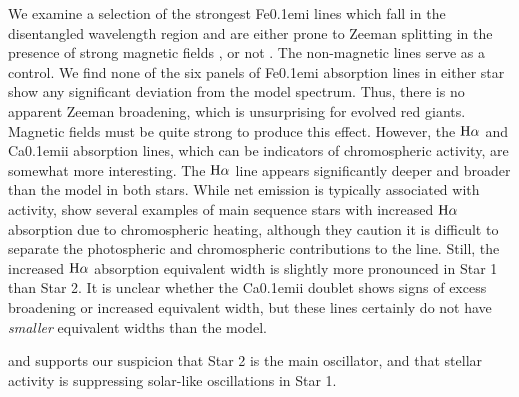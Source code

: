 We examine a selection of the strongest {\rm Fe}\kern 0.1em{\sc i} lines which fall in the disentangled wavelength region and are either prone to Zeeman splitting in the presence of strong magnetic fields \citep{har73}, or not \citep{sis70}. The non-magnetic lines serve as a control. We find none of the six panels of {\rm Fe}\kern 0.1em{\sc i} absorption lines in either star show any significant deviation from the model spectrum. Thus, there is no apparent Zeeman broadening, which is unsurprising for evolved red giants. Magnetic fields must be quite strong to produce this effect. However, the $\rm{H}\alpha$ and {\rm Ca}\kern 0.1em{\sc ii} absorption lines, which can be indicators of chromospheric activity, are somewhat more interesting. The $\rm{H}\alpha$ line appears significantly deeper and broader than the model in both stars. While net emission is typically associated with activity, \citet{rob90} show several examples of main sequence stars with increased $\rm{H}\alpha$ absorption due to chromospheric heating, although they caution it is difficult to separate the photospheric and chromospheric contributions to the line. Still, the increased $\rm{H}\alpha$ absorption equivalent width is slightly more pronounced in Star 1 than Star 2.  It is unclear whether the {\rm Ca}\kern 0.1em{\sc ii} doublet shows signs of excess broadening or increased equivalent width, but these lines certainly do not have \emph{smaller} equivalent widths than the model.

 and supports our suspicion that Star 2 is the main oscillator, and that stellar activity is suppressing solar-like oscillations in Star 1.
